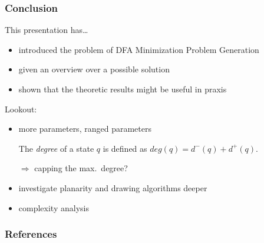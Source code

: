 \documentclass[handout,10pt]{beamer}%
\begin{document}
	\begin{frame}
		\frametitle{Conclusion}
		
		This presentation has\ldots
		\begin{itemize}
			\item introduced the problem of DFA Minimization Problem Generation
			\item given an overview over a possible solution
			\item shown that the theoretic results might be useful in praxis
		\end{itemize}
		Lookout:
		\begin{itemize}
			\item more parameters, ranged parameters
			
			The \emph{degree} of a state $q$ is defined as $deg(q) = d^-(q) + d^+(q)$.
			
			$\Rightarrow$ capping the max.\ degree?
			
			\item investigate planarity and drawing algorithms deeper
			\item complexity analysis
		\end{itemize}
	
	\end{frame}

	\begin{frame}
		\frametitle{References}
		
		\tiny
		
		
	\end{frame}
\end{document}
